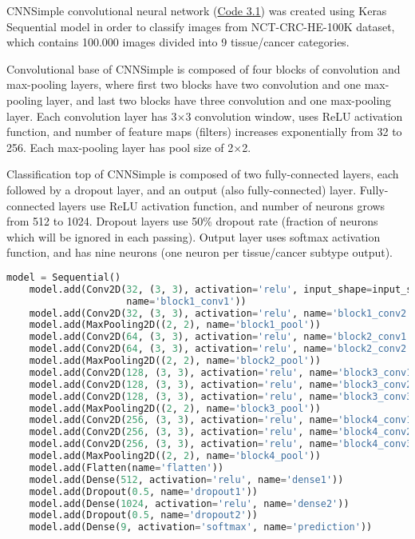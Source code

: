 CNNSimple convolutional neural network (\textcolor{red}{\hyperref[src:py1]{Code 3.1}}) was created using Keras Sequential model in order to classify images from NCT-CRC-HE-100K dataset, which contains 100.000 images divided into 9 tissue/cancer categories. 

Convolutional base of CNNSimple is composed of four blocks of convolution and max-pooling layers, where first two blocks have two convolution and one max-pooling layer, and last two blocks have three convolution and one max-pooling layer. Each convolution layer has 3$\times$3 convolution window, uses ReLU activation function, and number of feature maps (filters) increases exponentially from 32 to 256. Each max-pooling layer has pool size of 2$\times$2. 

Classification top of CNNSimple is composed of two fully-connected layers, each followed by a dropout layer, and an output (also fully-connected) layer. Fully-connected layers use ReLU activation function, and number of neurons grows from 512 to 1024. Dropout layers use 50\% dropout rate (fraction of neurons which will be ignored in each passing). Output layer uses softmax activation function, and has nine neurons (one neuron per tissue/cancer subtype output). 
\vspace{1mm}
\begin{lstlisting}[language={Python}, basicstyle=\scriptsize]
	model = Sequential()
	model.add(Conv2D(32, (3, 3), activation='relu', input_shape=input_shape,     
	                 name='block1_conv1'))
	model.add(Conv2D(32, (3, 3), activation='relu', name='block1_conv2'))
	model.add(MaxPooling2D((2, 2), name='block1_pool'))
	model.add(Conv2D(64, (3, 3), activation='relu', name='block2_conv1'))
	model.add(Conv2D(64, (3, 3), activation='relu', name='block2_conv2'))
	model.add(MaxPooling2D((2, 2), name='block2_pool'))
	model.add(Conv2D(128, (3, 3), activation='relu', name='block3_conv1'))
	model.add(Conv2D(128, (3, 3), activation='relu', name='block3_conv2'))
	model.add(Conv2D(128, (3, 3), activation='relu', name='block3_conv3'))
	model.add(MaxPooling2D((2, 2), name='block3_pool'))
	model.add(Conv2D(256, (3, 3), activation='relu', name='block4_conv1'))
	model.add(Conv2D(256, (3, 3), activation='relu', name='block4_conv2'))
	model.add(Conv2D(256, (3, 3), activation='relu', name='block4_conv3'))
	model.add(MaxPooling2D((2, 2), name='block4_pool'))
	model.add(Flatten(name='flatten'))
	model.add(Dense(512, activation='relu', name='dense1'))
	model.add(Dropout(0.5, name='dropout1'))
	model.add(Dense(1024, activation='relu', name='dense2'))
	model.add(Dropout(0.5, name='dropout2'))
	model.add(Dense(9, activation='softmax', name='prediction'))
\end{lstlisting} 

